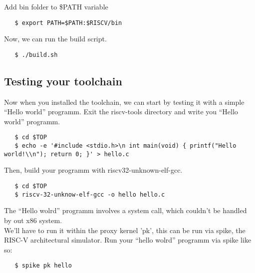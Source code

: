 Add bin folder to \$PATH variable

\begin{verbatim}
   $ export PATH=$PATH:$RISCV/bin
\end{verbatim}

Now, we can run the build script.

\begin{verbatim}
   $ ./build.sh
\end{verbatim}

\subsection{Testing your toolchain}

Now when you installed the toolchain, we can start by testing it with a simple ``Hello world'' programm.
Exit the riscv-tools directory and write you ``Hello world'' programm.

\begin{verbatim}
   $ cd $TOP
   $ echo -e '#include <stdio.h>\n int main(void) { printf("Hello world!\\n"); return 0; }' > hello.c
\end{verbatim}

Then, build your programm with riscv32-unknown-elf-gcc.

\begin{verbatim}
   $ cd $TOP
   $ riscv-32-unknow-elf-gcc -o hello hello.c
\end{verbatim}

The ``Hello wolrd'' programm involves a system call, which couldn't be handled by out x86 system. \\We'll have to run it within the proxy kernel 'pk', this can be run via spike, the RISC-V architectural simulator. Run your ``hello wolrd'' programm via spike like so:

\begin{verbatim}
   $ spike pk hello
\end{verbatim}
